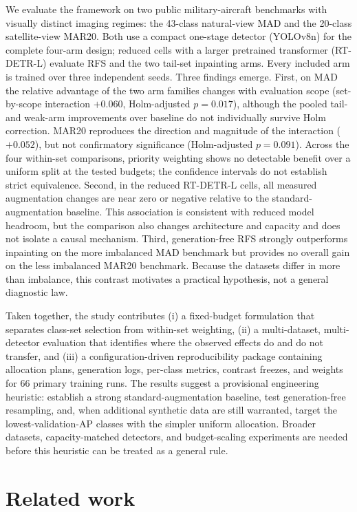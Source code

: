\documentclass[preprint,12pt,authoryear]{elsarticle}
\begin{document}
We evaluate the framework on two public military-aircraft benchmarks
with visually distinct imaging regimes: the 43-class natural-view MAD
and the 20-class satellite-view MAR20. Both use a compact one-stage
detector (YOLOv8n) for the complete four-arm design; reduced cells with a
larger pretrained transformer (RT-DETR-L) evaluate RFS and the two
tail-set inpainting arms. Every included arm is trained over three independent
seeds. Three findings emerge. First, on MAD the relative advantage of
the two arm families changes with evaluation scope (set-by-scope
interaction $+0.060$, Holm-adjusted $p = 0.017$), although the pooled
tail- and weak-arm improvements over baseline do not individually survive
Holm correction. MAR20 reproduces the direction and magnitude of the
interaction ($+0.052$), but not confirmatory significance (Holm-adjusted
$p = 0.091$). Across the four within-set comparisons, priority weighting
shows no detectable benefit over a uniform split at the tested budgets;
the confidence intervals do not establish strict equivalence. Second,
in the reduced RT-DETR-L cells, all measured augmentation changes are
near zero or negative relative to the standard-augmentation baseline.
This association is consistent with reduced model headroom, but the
comparison also changes architecture and capacity and does not isolate a
causal mechanism. Third, generation-free RFS strongly outperforms
inpainting on the more imbalanced MAD benchmark but provides no overall
gain on the less imbalanced MAR20 benchmark. Because the datasets differ
in more than imbalance, this contrast motivates a practical hypothesis,
not a general diagnostic law.

Taken together, the study contributes (i) a fixed-budget formulation
that separates class-set selection from within-set weighting, (ii) a
multi-dataset, multi-detector evaluation that identifies where the
observed effects do and do not transfer, and (iii) a configuration-driven
reproducibility package containing allocation plans, generation logs,
per-class metrics, contrast freezes, and weights for 66 primary training
runs. The results suggest a provisional engineering heuristic: establish
a strong standard-augmentation baseline, test generation-free resampling,
and, when additional synthetic data are still warranted, target the
lowest-validation-AP classes with the simpler uniform allocation. Broader
datasets, capacity-matched detectors, and budget-scaling experiments are
needed before this heuristic can be treated as a general rule.

\section{Related work}\label{sec:related}
\end{document}

